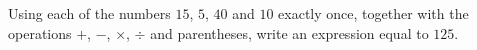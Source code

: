 Using each of the numbers $15$, $5$, $40$ and $10$ exactly once, together with the operations $+$, $-$, $\times$, $\div$ and parentheses, write an expression equal to $125$.
